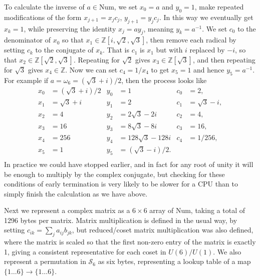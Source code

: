 To calculate the inverse of $a \in \text{Num}$, we set $x_0 = a$ and $y_0 = 1$, make repeated modifications of the form $x_{j+1} = x_jc_j$, $y_{j+1} = y_jc_j$. In this way we eventually get $x_k = 1$, while preserving the identity $x_j = ay_j$, meaning $y_k = a^{-1}$. We set $c_0$ to the denominator of $x_0$ so that $x_1 \in \mathbb{Z}[i, \sqrt{2}, \sqrt{3}]$, then remove each radical by setting $c_k$ to the conjugate of $x_k$. That is $c_1$ is $x_1$ but with $i$ replaced by $-i$, so that $x_2 \in \mathbb{Z}[\sqrt{2}, \sqrt{3}]$. Repeating for $\sqrt{2}$ gives $x_3 \in \mathbb{Z}[\sqrt{3}]$, and then repeating for $\sqrt{3}$ gives $x_4 \in \mathbb{Z}$. Now we can set $c_4 = 1/x_4$ to get $x_5 = 1$ and hence $y_5 = a^{-1}$. For example if $a = \omega_{6} = (\sqrt{3} + i)/2$, then the process looks like
\begin{align*}
	x_0 &= (\sqrt{3} + i)/2 & y_0 &= 1 & c_0 &= 2, \\
	x_1 &= \sqrt{3} + i & y_1 &= 2 & c_1 &= \sqrt{3}-i, \\
	x_2 &= 4 & y_2 &= 2\sqrt{3}-2i & c_2 &= 4, \\
	x_3 &= 16 & y_3 &= 8\sqrt{3}-8i & c_3 &= 16, \\
	x_4 &= 256 & y_4 &= 128\sqrt{3}-128i & c_4 &= 1/256, \\
	x_5 &= 1 & y_5 &= (\sqrt{3}-i)/2. & \\
\end{align*}
In practice we could have stopped earlier, and in fact for any root of unity it will be enough to multiply by the complex conjugate, but checking for these conditions of early termination is very likely to be slower for a CPU than to simply finish the calculation as we have above.

Next we represent a complex matrix as a $6\times 6$ array of Num, taking a total of 1296 bytes per matrix. Matrix multiplication is defined in the usual way, by setting $c_{ik} = \sum_j a_{ij}b_{jk}$, but reduced/coset matrix multiplication was also defined, where the matrix is scaled so that the first non-zero entry of the matrix is exactly 1, giving a consistent representative for each coset in $U(6)/U(1)$. We also represent a permutation in $\mathcal{S}_6$ as six bytes, representing a lookup table of a map $\{1\dots 6\} \to \{1 \dots 6\}$.

